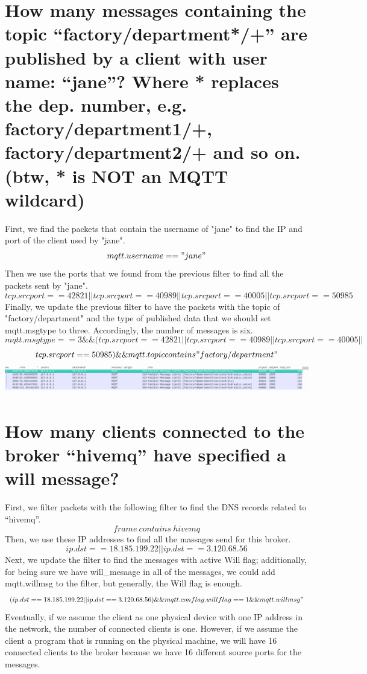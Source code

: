 \documentclass[10pt,english, openany]{book}
\begin{document}
\section{How many messages containing the topic “factory/department*/+” are published by a client with user name: “jane”? Where * replaces the dep. number, e.g. factory/department1/+, factory/department2/+ and so on. (btw, * is NOT an MQTT wildcard)}
First, we find the packets that contain the username of "jane" to find the IP and port of the client used by "jane".
\begin{equation*}mqtt.username == "jane"\end{equation*}
Then we use the ports that we found from the previous filter to find all the packets sent by "jane".
\begin{equation*}tcp.srcport ==42821 || tcp.srcport==40989 || tcp.srcport==40005 || tcp.srcport==50985\end{equation*}
Finally, we update the previous filter to have the packets with the topic of "factory/department" and the type of published data that we should set mqtt.msgtype to three. Accordingly, the number of messages is six.
\begin{equation*}mqtt.msgtype==3 \&\& (tcp.srcport ==42821 || tcp.srcport==40989 || tcp.srcport==40005 || \end{equation*}
\begin{equation*}tcp.srcport==50985)\&\& mqtt.topic contains "factory/department"\end{equation*}
\includegraphics[scale=0.27]{4.png}


\section{How many clients connected to the broker “hivemq” have specified a will message?}
First, we filter packets with the following filter to find the DNS records related to “hivemq”.
\begin{equation*}frame\:contains\:hivemq\end{equation*}
Then, we use these IP addresses to find all the massages send for this broker. 
\begin{equation*}ip.dst==18.185.199.22 || ip.dst==3.120.68.56\end{equation*}
Next, we update the filter to find the messages with active Will flag; additionally, for being sure we have will\_mesaage in all of the messages, we could add mqtt.willmsg to the filter, but generally, the Will flag is enough.
\begin{equation*}(ip.dst==18.185.199.22 || ip.dst==3.120.68.56) \&\& mqtt.conflag.willflag == 1 \&\& mqtt.willmsg"\end{equation*}
Eventually, if we assume the client as one physical device with one IP address in the network, the number of connected clients is one. However, if we assume the client a program that is running on the physical machine, we will have 16 connected clients to the broker because we have 16 different source ports for the messages.
\end{document}
